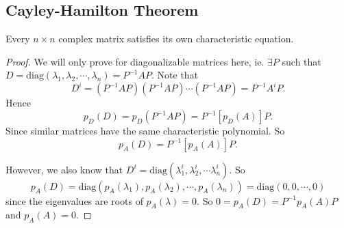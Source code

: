 \documentclass[a4paper]{article}
\begin{document}
  \subsection{Cayley-Hamilton Theorem}
  \begin{thm}
    Every $n\times n$ complex matrix satisfies its own characteristic equation.
  \end{thm}

  \begin{proof}
    We will only prove for diagonalizable matrices here, ie. $\exists P$ such that $D = \mathrm{diag}(\lambda_1, \lambda_2, \cdots, \lambda_n) = P^{-1}AP$.
    Note that
    \[
      D^i = (P^{-1}AP)(P^{-1}AP)\cdots(P^{-1}AP) = P^{-1}A^iP.
    \]
    Hence
    \[
      p_D(D) = p_D(P^{-1}AP) = P^{-1}[p_D(A)]P.
    \]
    Since similar matrices have the same characteristic polynomial. So
    \[
      p_A(D) = P^{-1}[p_A(A)]P.
    \]

    However, we also know that $D^i = \mathrm{diag}(\lambda_1^i, \lambda_2^i, \cdots \lambda_n^i)$. So
    \[
      p_A(D) = \mathrm{diag}(p_A(\lambda_1), p_A(\lambda_2), \cdots, p_A(\lambda_n)) = \mathrm{diag}(0, 0, \cdots, 0)
    \]
    since the eigenvalues are roots of $p_A(\lambda) = 0$. So $0 = p_A(D) = P^{-1}p_A(A)P$ and $p_A(A) = 0$.
  \end{proof}
\end{document}
